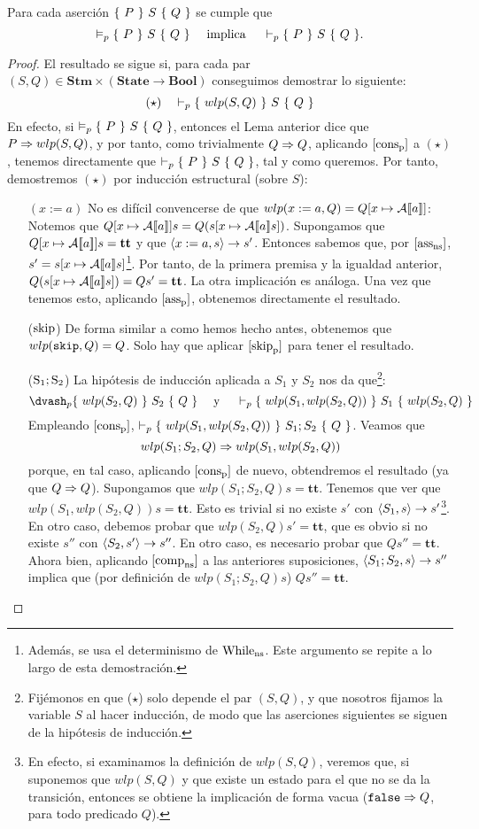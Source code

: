 \begin{theorem}[De Completitud]
Para cada aserción $\{\, \, P \, \, \}\, \, S\, \, \{ \, \, Q \, \, \}$ se cumple que 
$$\vDash_p \{\, \, P \, \, \}\, \, S\, \, \{ \, \, Q \, \, \}\quad \text{ implica }\quad\vdash_p \{\, \, P \, \, \}\, \, S\, \, \{ \, \, Q \, \, \}.$$
\end{theorem}
\begin{proof}
El resultado se sigue si, para cada par $(S, Q) \in \mathbf{Stm}\times(\mathbf{State} \to \mathbf{Bool})$ conseguimos demostrar lo siguiente: 
$$(\star) \quad \vdash_p \{\, \, wlp(S, Q) \, \, \}\, \, S\, \, \{ \, \, Q \, \, \}$$
En efecto, si $\vDash_p \{\, \, P \, \, \}\, \, S\, \, \{ \, \, Q \, \, \}$, entonces el Lema anterior dice que $P \Rightarrow wlp(S, Q)$, y por tanto, como trivialmente $Q \Rightarrow Q$, aplicando $[\mathrm{cons}_{\mathrm{p}}]$ a $(\star)$, tenemos directamente que $\vdash_p \{\, \, P \, \, \}\, \, S\, \, \{ \, \, Q \, \, \}$, tal y como queremos. Por tanto, demostremos $(\star)$ por inducción estructural (sobre $S$):
\begin{itemize}
    \item[$(x:=a)$] No es difícil convencerse de que $wlp(x:=a, Q) = Q[x\mapsto \mathcal{A}[\![a]\!]]$: Notemos que $Q[x \mapsto \mathcal{A}[\![a]\!]]s = Q(s[x \mapsto \mathcal{A}[\![a]\!]s])$. Supongamos que $Q[x\mapsto \mathcal{A}[\![a]\!]]s= \mathbf{tt}$ y que $\langle x:=a, s \rangle\to s'$. Entonces sabemos que, por $[\mathrm{ass}_{\mathrm{ns}}]$, $s' = s[x \mapsto \mathcal{A}[\![a]\!]s]$\footnote{Además, se usa el determinismo de $\mathrm{While}_{\mathrm{ns}}$. Este argumento se repite a lo largo de esta demostración.}. Por tanto, de la primera premisa y la igualdad anterior, $Q(s[x \mapsto \mathcal{A}[\![a]\!]s]) = Qs' = \mathbf{tt}$. La otra implicación es análoga. Una vez que tenemos esto, aplicando $[\mathrm{ass}_{\mathrm{p}}]$, obtenemos directamente el resultado.
    \item[($\mathrm{skip}$)] De forma similar a como hemos hecho antes, obtenemos que $wlp(\texttt{skip}, Q) = Q$. Solo hay que aplicar $[\mathrm{skip}_{\mathrm{p}}]$ para tener el resultado.
    \item[($\mathrm{S_1;S_2}$)] La hipótesis de inducción aplicada a $S_1$ y $S_2$ nos da que\footnote{Fijémonos en que ($\star$) solo depende el par $(S, Q)$, y que nosotros fijamos la variable $S$ al hacer inducción, de modo que las aserciones siguientes se siguen de la hipótesis de inducción.}:
    $$\dvash_p \pre{wlp(S_2, Q)}{S_2}{Q} \quad \text{ y } \quad \vdash_p \pre{wlp(S_1, wlp(S_2, Q))}{S_1}{wlp(S_2, Q)}$$
    Empleando $[\mathrm{cons}_{\mathrm{p}}]$, $\vdash_p \{\, \, wlp(S_1, wlp(S_2, Q)) \, \, \}\, \, S_1;S_2\, \, \{ \, \, Q \, \, \}$. Veamos que 
    $$wlp(S_1;S_2, Q)\Rightarrow wlp(S_1, wlp(S_2, Q))$$
    porque, en tal caso, aplicando $[\mathrm{cons}_{\mathrm{p}}]$ de nuevo, obtendremos el resultado (ya que $Q\Rightarrow Q$). Supongamos que $wlp(S_1;S_2, Q)s = \mathbf{tt}$. Tenemos que ver que $wlp(S_1, wlp(S_2, Q))s = \mathbf{tt}$. Esto es trivial si no existe $s'$ con $\langle S_1, s \rangle\to s'$\footnote{En efecto, si examinamos la definición de $wlp(S, Q)$, veremos que, si suponemos que $wlp(S, Q)$ y que existe un estado para el que no se da la transición, entonces se obtiene la implicación de forma vacua ($\texttt{false}\Rightarrow Q$, para todo predicado $Q$).}. En otro caso, debemos probar que $wlp(S_2, Q)s' = \mathbf{tt}$, que es obvio si no existe $s''$ con $\langle S_2, s' \rangle\to s''$. En otro caso, es necesario probar que $Qs'' = \mathbf{tt}$. Ahora bien, aplicando $[\mathrm{comp}_{\mathrm{ns}}]$ a las anteriores suposiciones, $\langle S_1;S_2, s \rangle\to s''$ implica que (por definición de $wlp(S_1;S_2, Q)s$) $Qs'' = \mathbf{tt}$.
    

\end{itemize}
\end{proof}
